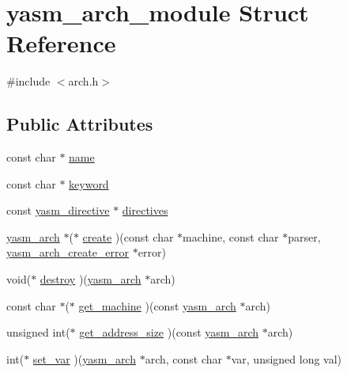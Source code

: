 \hypertarget{structyasm__arch__module}{\section{yasm\-\_\-arch\-\_\-module Struct Reference}
\label{structyasm__arch__module}
}


{\ttfamily \#include $<$arch.\-h$>$}

\subsection*{Public Attributes}
\begin{DoxyCompactItemize}
\item 
const char $\ast$ \hyperlink{structyasm__arch__module_af315f36d9f1ffdeb14de19b816ab8ab0}{name}
\item 
const char $\ast$ \hyperlink{structyasm__arch__module_adb00b33e390ee35db27e80cf415b7404}{keyword}
\item 
const \hyperlink{structyasm__directive}{yasm\-\_\-directive} $\ast$ \hyperlink{structyasm__arch__module_a4619ed342e98203bfc1edcdeb9eec65c}{directives}
\item 
\hyperlink{coretype_8h_a8e0de61d73c940f0e7b6ef12e0dc1c70}{yasm\-\_\-arch} $\ast$($\ast$ \hyperlink{structyasm__arch__module_a1c8c7a915d05db99e62b54a82d764231}{create} )(const char $\ast$machine, const char $\ast$parser, \hyperlink{arch_8h_a6c9e33e39484739985d931045ca2faa2}{yasm\-\_\-arch\-\_\-create\-\_\-error} $\ast$error)
\item 
void($\ast$ \hyperlink{structyasm__arch__module_a60d0078567b6c0a25f3e9f29fb710d0b}{destroy} )(\hyperlink{coretype_8h_a8e0de61d73c940f0e7b6ef12e0dc1c70}{yasm\-\_\-arch} $\ast$arch)
\item 
const char $\ast$($\ast$ \hyperlink{structyasm__arch__module_ad28eebf86539d87b4efabc55dbd47713}{get\-\_\-machine} )(const \hyperlink{coretype_8h_a8e0de61d73c940f0e7b6ef12e0dc1c70}{yasm\-\_\-arch} $\ast$arch)
\item 
unsigned int($\ast$ \hyperlink{structyasm__arch__module_a3f82738da091b9e2967e795f4d59de76}{get\-\_\-address\-\_\-size} )(const \hyperlink{coretype_8h_a8e0de61d73c940f0e7b6ef12e0dc1c70}{yasm\-\_\-arch} $\ast$arch)
\item 
int($\ast$ \hyperlink{structyasm__arch__module_a8479f90a6dc66a0e092149d39bb0240e}{set\-\_\-var} )(\hyperlink{coretype_8h_a8e0de61d73c940f0e7b6ef12e0dc1c70}{yasm\-\_\-arch} $\ast$arch, const char $\ast$var, unsigned long val)

\end{DoxyCompactItemize}
